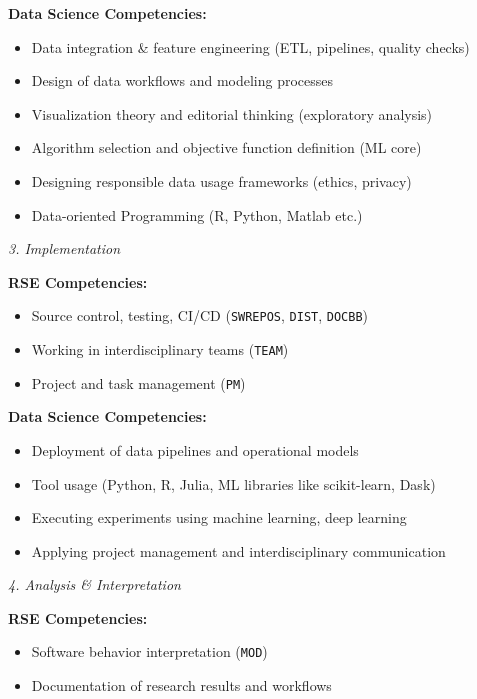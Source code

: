 \documentclass[
        english,biblatex
    ]{lni}
\providecommand{\tightlist}{%
    \setlength{\itemsep}{0pt}\setlength{\parskip}{0pt}}
\begin{document}
    \textbf{Data Science Competencies:}

    \begin{itemize}
    \tightlist
    \item
      Data integration \& feature engineering (ETL, pipelines, quality
      checks)
    \item
      Design of data workflows and modeling processes
    \item
      Visualization theory and editorial thinking (exploratory analysis)
    \item
      Algorithm selection and objective function definition (ML core)
    \item
      Designing responsible data usage frameworks (ethics, privacy)
    \item
      Data-oriented Programming (R, Python, Matlab etc.)
    \end{itemize}

    \emph{3. Implementation}

    \textbf{RSE Competencies:}

    \begin{itemize}
    \tightlist
    \item
      Source control, testing, CI/CD (\texttt{SWREPOS}, \texttt{DIST},
      \texttt{DOCBB})
    \item
      Working in interdisciplinary teams (\texttt{TEAM})
    \item
      Project and task management (\texttt{PM})
    \end{itemize}

    \textbf{Data Science Competencies:}

    \begin{itemize}
    \tightlist
    \item
      Deployment of data pipelines and operational models
    \item
      Tool usage (Python, R, Julia, ML libraries like scikit-learn,
      Dask)
    \item
      Executing experiments using machine learning, deep learning
    \item
      Applying project management and interdisciplinary communication
    \end{itemize}

    \emph{4. Analysis \& Interpretation}

    \textbf{RSE Competencies:}

    \begin{itemize}
    \tightlist
    \item
      Software behavior interpretation (\texttt{MOD})
    \item
      Documentation of research results and workflows
    \end{itemize}
\end{document}
